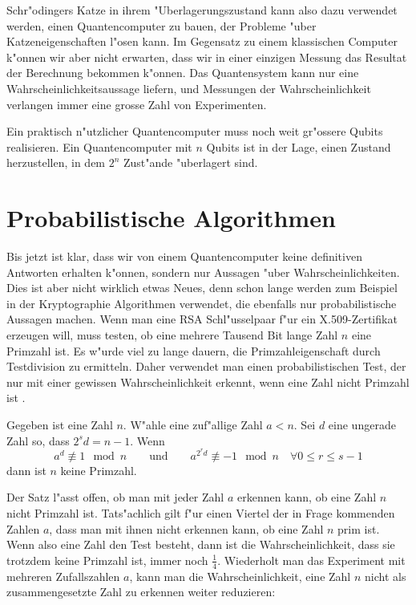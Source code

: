 Schr"odingers Katze in ihrem "Uberlagerungszustand kann also dazu
verwendet werden, einen Quantencomputer zu bauen, der Probleme "uber
Katzeneigenschaften l"osen kann.
Im Gegensatz zu einem klassischen Computer k"onnen wir aber nicht
erwarten, dass wir in einer einzigen Messung das Resultat der
Berechnung bekommen k"onnen.
Das Quantensystem kann nur eine Wahrscheinlichkeitsaussage liefern,
und Messungen der Wahrscheinlichkeit verlangen immer eine grosse Zahl
von Experimenten.

Ein praktisch n"utzlicher Quantencomputer muss noch weit gr"ossere
Qubits realisieren.
Ein Quantencomputer mit $n$ Qubits ist in der Lage, einen Zustand
herzustellen, in dem $2^n$ Zust"ande "uberlagert sind. 

\section{Probabilistische Algorithmen}
Bis jetzt ist klar, dass wir von einem Quantencomputer keine definitiven
Antworten erhalten k"onnen, sondern nur Aussagen "uber Wahrscheinlichkeiten.
Dies ist aber nicht wirklich etwas Neues, denn schon lange werden
zum Beispiel in der Kryptographie Algorithmen verwendet, die ebenfalls
nur probabilistische Aussagen machen.
Wenn man eine RSA Schl"usselpaar f"ur ein X.509-Zertifikat erzeugen will,
muss testen, ob eine mehrere Tausend Bit lange Zahl $n$ eine Primzahl ist.
Es w"urde viel zu lange dauern, die Primzahleigenschaft durch Testdivision 
zu ermitteln.
Daher verwendet man einen probabilistischen Test, der nur mit einer
gewissen Wahrscheinlichkeit erkennt, wenn eine Zahl nicht Primzahl ist
\cite{skript:miller-rabin}.

\begin{satz}
\label{skript:quantencomputer:miller-rabin-kriterium}
Gegeben ist eine Zahl $n$. W"ahle eine zuf"allige Zahl $a<n$. Sei $d$
eine ungerade Zahl so, dass $2^sd=n-1$. Wenn 
\[
a^d\not\equiv 1\mod n
\qquad\text{und}\qquad
a^{2^rd}\not\equiv -1\mod n\quad\forall 0\le r\le s-1
\]
dann ist $n$ keine Primzahl.
\end{satz}

Der Satz l"asst offen, ob man mit jeder Zahl $a$ erkennen kann, ob
eine Zahl $n$ nicht Primzahl ist.
Tats"achlich gilt f"ur einen Viertel der in Frage kommenden Zahlen
$a$, dass man mit ihnen nicht erkennen kann, ob eine Zahl $n$ prim ist.
Wenn also eine Zahl den Test besteht, dann ist die Wahrscheinlichkeit,
dass sie trotzdem keine Primzahl ist, immer noch $\frac14$. Wiederholt
man das Experiment mit mehreren Zufallszahlen $a$, kann man die
Wahrscheinlichkeit, eine Zahl $n$ nicht als zusammengesetzte Zahl zu
erkennen weiter reduzieren:

